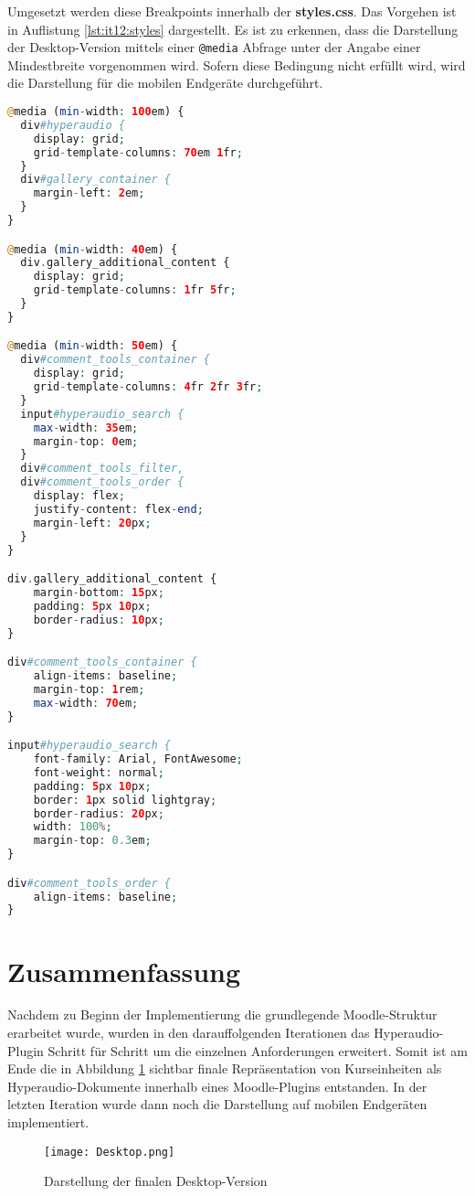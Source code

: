 Umgesetzt werden diese Breakpoints innerhalb der \textbf{styles.css}. Das Vorgehen ist in Auflistung \ref{lst:it12:styles} dargestellt. Es ist zu erkennen, dass die Darstellung der Desktop-Version mittels einer \texttt{@media} Abfrage unter der Angabe einer Mindestbreite vorgenommen wird. Sofern diese Bedingung nicht erfüllt wird, wird die Darstellung für die mobilen Endgeräte durchgeführt.

\begin{lstlisting}[language=php,
             linewidth=\textwidth,
             caption={Ausschnitt der \textbf{styles.css} in der 12. Iteration},
             label={lst:it12:styles}]
@media (min-width: 100em) {
  div#hyperaudio {
    display: grid;
    grid-template-columns: 70em 1fr;
  }
  div#gallery_container {
    margin-left: 2em;
  }
}

@media (min-width: 40em) {
  div.gallery_additional_content {
    display: grid;
    grid-template-columns: 1fr 5fr;
  }
}

@media (min-width: 50em) {
  div#comment_tools_container {
    display: grid;
    grid-template-columns: 4fr 2fr 3fr;
  }
  input#hyperaudio_search {
  	max-width: 35em;
  	margin-top: 0em;
  }
  div#comment_tools_filter,
  div#comment_tools_order {
  	display: flex;
    justify-content: flex-end;
    margin-left: 20px;
  }
}

div.gallery_additional_content {
    margin-bottom: 15px;
    padding: 5px 10px;
    border-radius: 10px;
}

div#comment_tools_container {
	align-items: baseline;
    margin-top: 1rem;
    max-width: 70em;
}

input#hyperaudio_search {
    font-family: Arial, FontAwesome;
    font-weight: normal;
    padding: 5px 10px;
    border: 1px solid lightgray;
    border-radius: 20px;
    width: 100%;
    margin-top: 0.3em;
}

div#comment_tools_order {
    align-items: baseline;
}
\end{lstlisting}

\section{Zusammenfassung}
Nachdem zu Beginn der Implementierung die grundlegende Moodle-Struktur erarbeitet wurde, wurden in den darauffolgenden Iterationen das Hyperaudio-Plugin Schritt für Schritt um die einzelnen Anforderungen erweitert. Somit ist am Ende die in Abbildung \ref{fig:DesktopFinal} sichtbar finale Repräsentation von Kurseinheiten als Hyperaudio-Dokumente innerhalb eines Moodle-Plugins entstanden. In der letzten Iteration wurde dann noch die Darstellung auf mobilen Endgeräten implementiert.
\begin{figure}[h!]
\texttt{[image: Desktop.png]}
\caption{\label{fig:DesktopFinal}Darstellung der finalen Desktop-Version}
\end{figure}